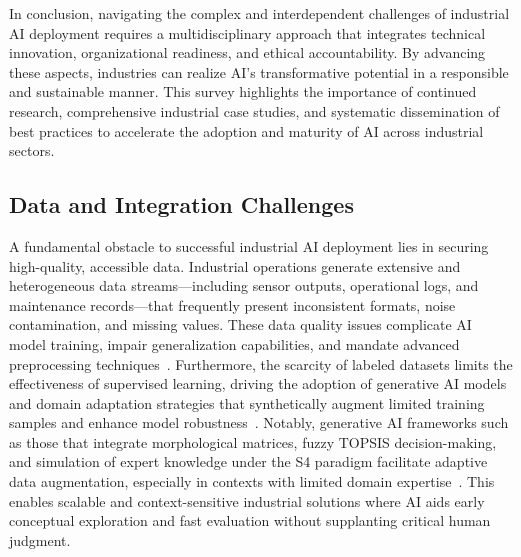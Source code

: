 \documentclass[sigconf]{acmart}
\begin{document}
In conclusion, navigating the complex and interdependent challenges of industrial AI deployment requires a multidisciplinary approach that integrates technical innovation, organizational readiness, and ethical accountability. By advancing these aspects, industries can realize AI’s transformative potential in a responsible and sustainable manner. This survey highlights the importance of continued research, comprehensive industrial case studies, and systematic dissemination of best practices to accelerate the adoption and maturity of AI across industrial sectors.

\subsection{Data and Integration Challenges}

A fundamental obstacle to successful industrial AI deployment lies in securing high-quality, accessible data. Industrial operations generate extensive and heterogeneous data streams—including sensor outputs, operational logs, and maintenance records—that frequently present inconsistent formats, noise contamination, and missing values. These data quality issues complicate AI model training, impair generalization capabilities, and mandate advanced preprocessing techniques~\cite{ref6,ref9}. Furthermore, the scarcity of labeled datasets limits the effectiveness of supervised learning, driving the adoption of generative AI models and domain adaptation strategies that synthetically augment limited training samples and enhance model robustness~\cite{ref2,ref3}. Notably, generative AI frameworks such as those that integrate morphological matrices, fuzzy TOPSIS decision-making, and simulation of expert knowledge under the S4 paradigm facilitate adaptive data augmentation, especially in contexts with limited domain expertise~\cite{ref2}. This enables scalable and context-sensitive industrial solutions where AI aids early conceptual exploration and fast evaluation without supplanting critical human judgment.
\end{document}
